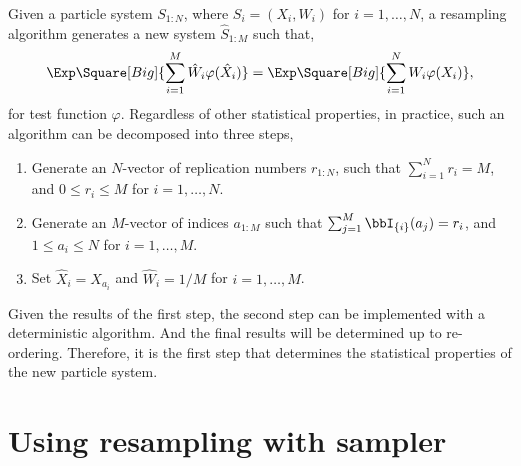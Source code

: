 Given a particle system $S_{1:N}$, where $S_i = (X_i,W_i)$ for $i = 1,\dots,N$,
a resampling algorithm generates a new system $\hat{S}_{1:M}$ such that,
\begin{equation*}
  \Exp\Square[Big]{\sum_{i=1}^M{\hat{W}_i\varphi(\hat{X}_i)}} =
  \Exp\Square[Big]{\sum_{i=1}^N{W_i\varphi(X_i)}},
\end{equation*}
for test function $\varphi$. Regardless of other statistical properties, in
practice, such an algorithm can be decomposed into three steps,
\begin{enumerate}
  \item Generate an $N$-vector of replication numbers $r_{1:N}$, such that
    $\sum_{i=1}^N r_i = M$, and $0 \le r_i \le M$ for $i=1,\dots,N$.
  \item Generate an $M$-vector of indices $a_{1:M}$ such that $\sum_{j=1}^M
    \bbI_{\{i\}}(a_j) = r_i$, and $1 \le a_i \le N$ for $i = 1,\dots,M$.
  \item Set $\hat{X}_i = X_{a_i}$ and $\hat{W}_i = 1 / M$ for $i = 1,\dots,M$.
\end{enumerate}
Given the results of the first step, the second step can be implemented with a
deterministic algorithm. And the final results will be determined up to
re-ordering. Therefore, it is the first step that determines the statistical
properties of the new particle system.

\section{Using resampling with sampler}
\label{sec:Using resampling with sampler}

